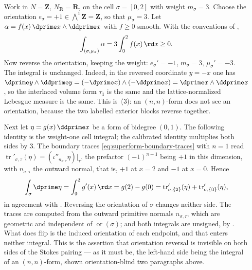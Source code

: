 \begin{example}
\label{ex:ch10-sign-test-segment}
Work in $N=\mathbf Z$, $N_{\mathbf R}=\mathbf R$, on the cell
$\sigma=[0,2]$ with weight $m_\sigma=3$.  Choose the orientation
$e_\sigma=+1\in\bigwedge^1\mathbf Z=\mathbf Z$, so that
$\mu_\sigma=3$.  Let $\alpha=f(x)\,\dprime x\wedge\ddprime x$ with $f\geq0$
smooth.  With the conventions of
,
\[
 \int_{(\sigma,\mu_\sigma)}\alpha
 =3\int_0^2f(x)\,\rd x\geq0 .
\]
Now reverse the orientation, keeping the weight: $e_\sigma'=-1$,
$m_\sigma=3$, $\mu_\sigma'=-3$.  The integral is unchanged.  Indeed, in the
reversed coordinate $y=-x$ one has
$\dprime y\wedge\ddprime y=(-\dprime x)\wedge(-\ddprime x)
=\dprime x\wedge\ddprime x$, so the interlaced volume form $\tau_1$ is the
same and the lattice-normalized Lebesgue measure is the same.  This is
\,(3): an $(n,n)$-form does not see an
orientation, because the two labelled exterior blocks reverse together.

Next let $\eta=g(x)\,\ddprime x$ be a form of bidegree $(0,1)$.  The
following identity is the weight-one cell integral; the calibrated identity
multiplies both sides by $3$. The boundary traces
\eqref{eq:superform-boundary-traces} with $n=1$ read
$\operatorname{tr}'_{\sigma,\tau}(\eta)=(\iota''_{n_{\sigma,\tau}}\eta)|_\tau$,
the prefactor $(-1)^{n-1}$ being $+1$ in this dimension, with
$n_{\sigma,\tau}$ the outward normal, that is, $+1$ at $x=2$ and $-1$ at
$x=0$.  Hence
\[
 \int_\sigma\dprime\eta
 =\int_0^2g'(x)\,\rd x
 =g(2)-g(0)
 =\operatorname{tr}'_{\sigma,\{2\}}(\eta)
  +\operatorname{tr}'_{\sigma,\{0\}}(\eta),
\]
in agreement with .  Reversing the orientation of
$\sigma$ changes neither side.  The traces are computed from the outward
primitive normals $n_{\sigma,\tau}$, which are geometric and independent of
$\operatorname{or}(\sigma)$; and both integrals are unsigned, by
.  What does flip is the induced
orientation of each endpoint, and that enters neither integral.  This is
the assertion that orientation reversal is invisible on both sides of the
Stokes pairing --- as it must be, the left-hand side being the integral of
an $(n,n)$-form, shown orientation-blind two paragraphs above.
\end{example}

